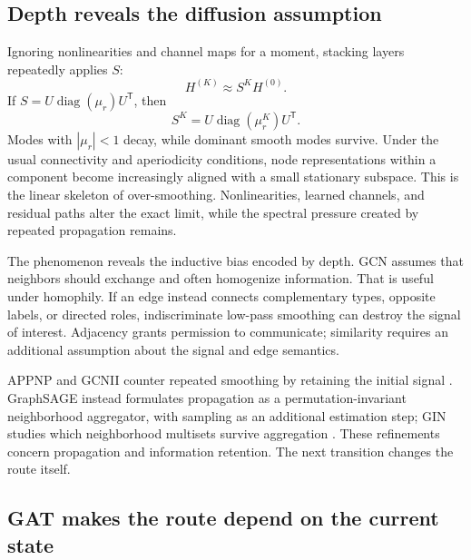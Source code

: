 \subsection{Depth reveals the diffusion assumption}

Ignoring nonlinearities and channel maps for a moment, stacking layers repeatedly applies $S$:
\begin{equation}
H^{(K)}\approx S^KH^{(0)}.
\label{eq:book-gcn-repeated-propagation}
\end{equation}
If $S=U\operatorname{diag}(\mu_r)U^{\mathsf T}$, then
\begin{equation}
S^K=U\operatorname{diag}(\mu_r^K)U^{\mathsf T}.
\label{eq:book-gcn-power-spectrum}
\end{equation}
Modes with $|\mu_r|<1$ decay, while dominant smooth modes survive.  Under the usual connectivity
and aperiodicity conditions, node representations within a component become increasingly aligned
with a small stationary subspace.  This is the linear skeleton of over-smoothing.  Nonlinearities,
learned channels, and residual paths alter the exact limit, while the spectral pressure created by
repeated propagation remains.

The phenomenon reveals the inductive bias encoded by depth.  GCN assumes that
neighbors should exchange and often homogenize information.  That is useful under homophily.  If
an edge instead connects complementary types, opposite labels, or directed roles, indiscriminate
low-pass smoothing can destroy the signal of interest.  Adjacency grants permission to
communicate; similarity requires an additional assumption about the signal and edge semantics.

APPNP and GCNII counter repeated smoothing by retaining the initial signal
\cite{klicpera2019,chen2020gcnii}.  GraphSAGE instead formulates propagation as a
permutation-invariant neighborhood aggregator, with sampling as an additional estimation step;
GIN studies which neighborhood multisets survive aggregation
\cite{hamilton2017,xu2019gin}.  These refinements concern propagation and information retention.
The next transition changes the route itself.

\subsection{GAT makes the route depend on the current state}

